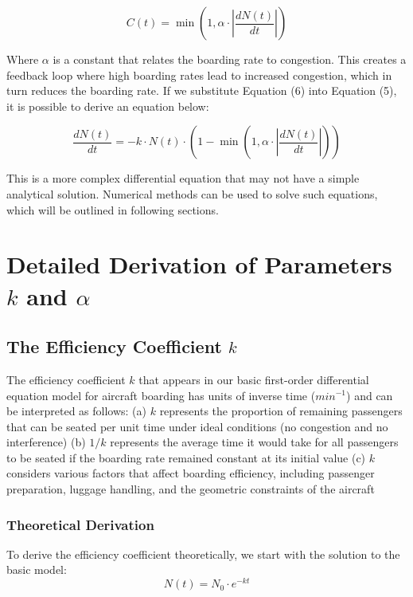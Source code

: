 \documentclass[12pt]{article}
\begin{document}
\begin{equation}
C(t) = \min\left(1, \alpha \cdot \left|\frac{dN(t)}{dt}\right|\right)
\end{equation}

Where $\alpha$ is a constant that relates the boarding rate to congestion. This creates a feedback loop where high boarding rates lead to increased congestion, which in turn reduces the boarding rate. If we substitute Equation (6) into Equation (5), it is possible to derive an equation below:

\begin{equation}
\frac{dN(t)}{dt} = -k \cdot N(t) \cdot \left(1 - \min\left(1, \alpha \cdot \left|\frac{dN(t)}{dt}\right|\right)\right)
\end{equation}

This is a more complex differential equation that may not have a simple analytical solution. Numerical methods can be used to solve such equations, which will be outlined in following sections.

\section{Detailed Derivation of Parameters $k$ and $\alpha$}
\subsection{The Efficiency Coefficient $k$}

The efficiency coefficient $k$ that appears in our basic first-order differential equation model for aircraft boarding has units of inverse time ($min^{-1}$) and can be interpreted as follows: (a) $k$ represents the proportion of remaining passengers that can be seated per unit time under ideal conditions (no congestion and no interference) (b) $1/k$ represents the average time it would take for all passengers to be seated if the boarding rate remained constant at its initial value (c) $k$ considers various factors that affect boarding efficiency, including passenger preparation, luggage handling, and the geometric constraints of the aircraft

\subsubsection{Theoretical Derivation}

To derive the efficiency coefficient theoretically, we start with the solution to the basic model:
\begin{equation}
N(t) = N_0 \cdot e^{-kt}
\end{equation}
\end{document}
